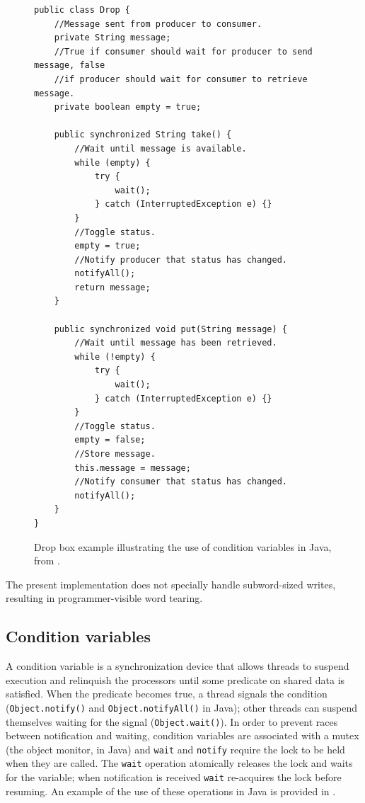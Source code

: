 \begin{figure}\sis\fontsize{9}{10}
\begin{verbatim}
public class Drop {
    //Message sent from producer to consumer.
    private String message;
    //True if consumer should wait for producer to send message, false
    //if producer should wait for consumer to retrieve message.
    private boolean empty = true;

    public synchronized String take() {
        //Wait until message is available.
        while (empty) {
            try {
                wait();
            } catch (InterruptedException e) {}
        }
        //Toggle status.
        empty = true;
        //Notify producer that status has changed.
        notifyAll();
        return message;
    }

    public synchronized void put(String message) {
        //Wait until message has been retrieved.
        while (!empty) {
            try { 
                wait();
            } catch (InterruptedException e) {}
        }
        //Toggle status.
        empty = false;
        //Store message.
        this.message = message;
        //Notify consumer that status has changed.
        notifyAll();
    }
}
\end{verbatim}
\caption[Drop box example illustrating the use of condition variables
  in Java]{Drop box example illustrating the use of condition variables
  in Java, from \cite{ZakhourHoRoRaRiHo06}.}\label{fig:dropbox}
\end{figure}

The present implementation does not specially handle subword-sized
writes, resulting in programmer-visible word tearing.

\subsection{Condition variables}\label{sec:object-wait}
A condition variable is a synchronization device that allows threads
to suspend execution and relinquish the processors until some
predicate on shared data is satisfied.  When the predicate becomes
true, a thread signals the condition (\texttt{Object.notify()} and
\texttt{Object.notifyAll()} in Java); other threads can suspend
themselves waiting for the signal (\texttt{Object.wait()}).  In order
to prevent races between notification and waiting, condition variables
are associated with a mutex (the object monitor, in Java) and
\texttt{wait} and \texttt{notify} require the lock to be held when
they are called.  The \texttt{wait} operation atomically releases the
lock and waits for the variable; when notification is received
\texttt{wait} re-acquires the lock before resuming.  An example of the
use of these operations in Java is provided in .

